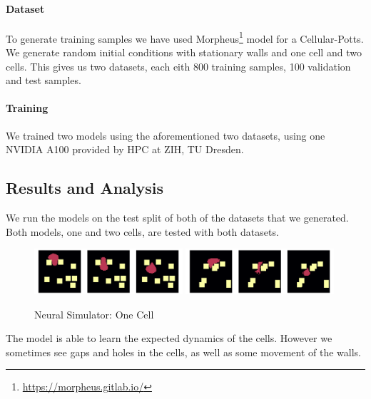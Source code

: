 \documentclass[a4paper,10pt,twocolumn]{article}
\begin{document}
        \paragraph{Dataset}
        To generate training samples we have used Morpheus\footnote{\url{https://morpheus.gitlab.io/}}\cite{morpheus} 
        model for a Cellular-Potts.
        We generate random initial conditions with stationary walls and one cell and two cells. 
        This gives us two datasets, each eith 800 training samples, 100 validation and test samples.
        
        \paragraph{Training}
        We trained two models using the aforementioned two datasets, using one NVIDIA A100 
        provided by HPC at ZIH, TU Dresden.

        \subsection{Results and Analysis}
            We run the models on the test split of both of the datasets that we generated.
            Both models, one and two cells, are tested with both datasets.

            \begin{figure}[H]\centering
                \includegraphics[width=0.49\textwidth]{../images/run_40.png}
                \includegraphics[width=0.49\textwidth]{../images/run_32.png}
                \caption{Neural Simulator: One Cell}
            \end{figure}
            The model is able to learn the expected dynamics of the cells.
            However we sometimes see gaps and holes
            in the cells, as well as some movement of the walls.
\end{document}

